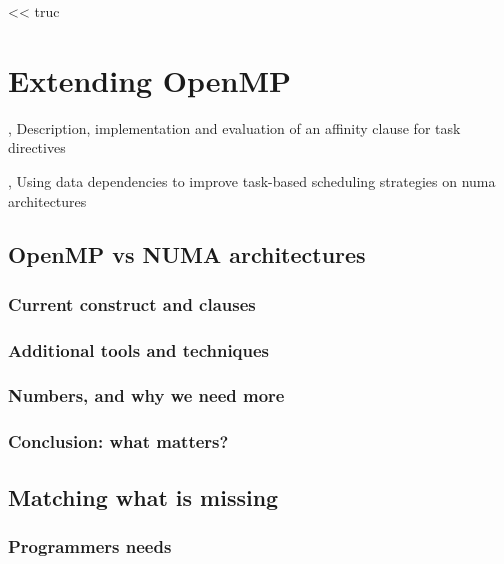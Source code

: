 
\begin{savequote}[6cm]
<< truc
\end{savequote}

\chapter{Extending OpenMP}\label{chap:contrib:TODO}
\chaptertoc


%



\cite{Virouleau2016}, Description, implementation and evaluation of an affinity clause for task directives

\cite{Virouleau2016b}, Using data dependencies to improve task-based scheduling strategies on numa architectures


\section{OpenMP vs NUMA architectures}

\subsection{Current construct and clauses}
\subsection{Additional tools and techniques}
\subsection{Numbers, and why we need more}
\subsection{Conclusion: what matters?}

\section{Matching what is missing}
\subsection{Programmers needs}
